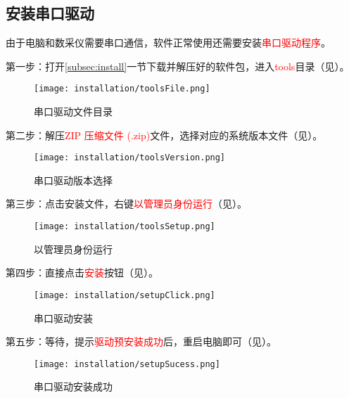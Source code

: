 \subsection{安装串口驱动}
\par 由于电脑和数采仪需要串口通信，软件正常使用还需要安装\textcolor{red}{串口驱动程序}。
\par 第一步：打开\ref{subsec:install}一节下载并解压好的软件包，进入\textcolor{red}{tools}目录（见）。
\begin{figure}[H]
    \centering
    \texttt{[image: installation/toolsFile.png]}
    \caption{ 串口驱动文件目录 \label{fig:toolsFile}}
\end{figure}
\par 第二步：解压\textcolor{red}{ZIP 压缩文件 (.zip)}文件，选择对应的系统版本文件（见）。
\begin{figure}[H]
    \centering
    \texttt{[image: installation/toolsVersion.png]}
    \caption{ 串口驱动版本选择 \label{fig:toolsVersion}}
\end{figure}
\par 第三步：点击安装文件，右键\textcolor{red}{以管理员身份运行}（见）。
\begin{figure}[H]
    \centering
    \texttt{[image: installation/toolsSetup.png]}
    \caption{ 以管理员身份运行 \label{fig:toolsSetup}}
\end{figure}
\par 第四步：直接点击\textcolor{red}{安装}按钮（见）。
\begin{figure}[H]
    \centering
    \texttt{[image: installation/setupClick.png]}
    \caption{ 串口驱动安装 \label{fig:setupClick}}
\end{figure}
\par 第五步：等待，提示\textcolor{red}{驱动预安装成功}后，重启电脑即可（见）。
\begin{figure}[H]
    \centering
    \texttt{[image: installation/setupSucess.png]}
    \caption{ 串口驱动安装成功 \label{fig:setupSucess}}
\end{figure}
